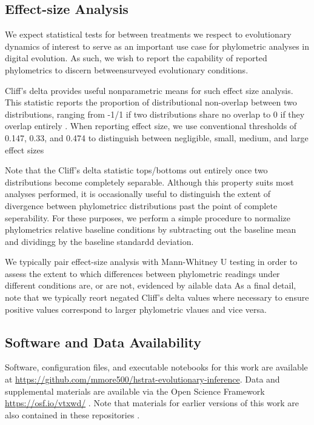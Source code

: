 \subsection{Effect-size Analysis}

We expect statistical tests for between treatments we respect to evolutionary dynamics of interest to serve as an important use case for phylometric analyses in digital evolution.
As such, we wish to report the capability of reported phylometrics to discern betweensurveyed evolutionary conditions.

Cliff's delta provides useful nonparametric means for such effect size analysis.
This statistic reports the proportion of distributional non-overlap between two distributions, ranging from -1/1 if two distributions share no overlap to 0 if they overlap entirely \citep{meissel2024using,cliff1993dominance}.
When reporting effect size, we use conventional thresholds of 0.147, 0.33, and 0.474 to distinguish between negligible, small, medium, and large effect sizes \citep{hess2004robust}

Note that the Cliff's delta statistic tops/bottoms out entirely once two distributions become completely separable.
Although this property suits most analyses performed, it is occasionally useful to distinguish the extent of divergence between phylometricc distributions past the point of complete seperability.
For these purposes, we perform a simple procedure to normalize phylometrics relative baseline conditions by subtracting out the baseline mean and dividingg by the baseline standardd deviation.

We typically pair effect-size analysis with Mann-Whitney U testing in order to assess the extent to which differences between phylometric readings under different conditions are, or are not, evidenced by ailable data  \citep{mann1947on}
As a final detail, note that we typically reort negated Cliff's delta values where necessary to ensure positive values correspond to larger phylometric vlaues and vice versa.

\subsection{Software and Data Availability}

Software, configuration files, and executable notebooks for this work are available at \url{https://github.com/mmore500/hstrat-evolutionary-inference}.
Data and supplemental materials are available via the Open Science Framework \url{https://osf.io/vtxwd/} \citep{foster2017open}.
Note that materials for earlier versions of this work are also contained in these repositories \citep{moreno2023toward}.

